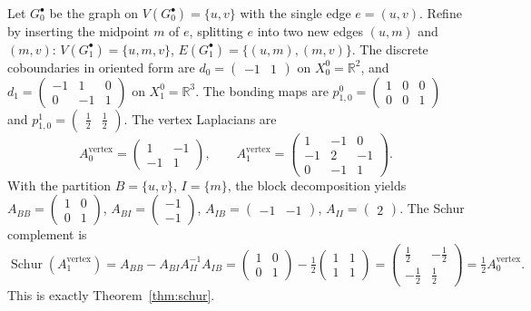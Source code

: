 \documentclass[11pt]{article}
\theoremstyle{plain}
\theoremstyle{definition}
\theoremstyle{remark}
\newcommand{\R}{\mathbb{R}}
\newcommand{\Schur}{\operatorname{Schur}}
\begin{document}
Let $G_0^{\bullet}$ be the graph on
$V(G_0^{\bullet}) = \{u, v\}$ with the single edge $e = (u, v)$.
Refine by inserting the midpoint $m$ of $e$, splitting $e$ into
two new edges $(u, m)$ and $(m, v)$:
$V(G_1^{\bullet}) = \{u, m, v\}$,
$E(G_1^{\bullet}) = \{(u, m), (m, v)\}$. The discrete coboundaries
in oriented form are
$d_0 = \begin{pmatrix} -1 & 1 \end{pmatrix}$ on $X_0^{0} = \R^{2}$,
and
$d_1 = \begin{pmatrix} -1 & 1 & 0 \\ 0 & -1 & 1 \end{pmatrix}$ on
$X_1^{0} = \R^{3}$. The bonding maps are
$p^{0}_{1, 0} = \begin{pmatrix} 1 & 0 & 0 \\ 0 & 0 & 1 \end{pmatrix}$
and
$p^{1}_{1, 0} = \begin{pmatrix} \tfrac12 & \tfrac12 \end{pmatrix}$.
The vertex Laplacians are
\[
   A_0^{\mathrm{vertex}} =
   \begin{pmatrix} 1 & -1 \\ -1 & 1 \end{pmatrix},
   \qquad
   A_1^{\mathrm{vertex}} =
   \begin{pmatrix} 1 & -1 & 0 \\ -1 & 2 & -1 \\ 0 & -1 & 1 \end{pmatrix}.
\]
With the partition $B = \{u, v\}$, $I = \{m\}$, the block
decomposition yields
$A_{BB} = \begin{pmatrix} 1 & 0 \\ 0 & 1 \end{pmatrix}$,
$A_{BI} = \begin{pmatrix} -1 \\ -1 \end{pmatrix}$,
$A_{IB} = \begin{pmatrix} -1 & -1 \end{pmatrix}$,
$A_{II} = \begin{pmatrix} 2 \end{pmatrix}$. The Schur complement is
\[
\Schur(A_1^{\mathrm{vertex}}) =
   A_{BB} - A_{BI} A_{II}^{-1} A_{IB}
   = \begin{pmatrix} 1 & 0 \\ 0 & 1 \end{pmatrix}
   - \tfrac12 \begin{pmatrix} 1 & 1 \\ 1 & 1 \end{pmatrix}
   = \begin{pmatrix} \tfrac12 & -\tfrac12 \\ -\tfrac12 & \tfrac12 \end{pmatrix}
   = \tfrac12 A_0^{\mathrm{vertex}}.
\]
This is exactly Theorem~\ref{thm:schur}.
\end{document}
